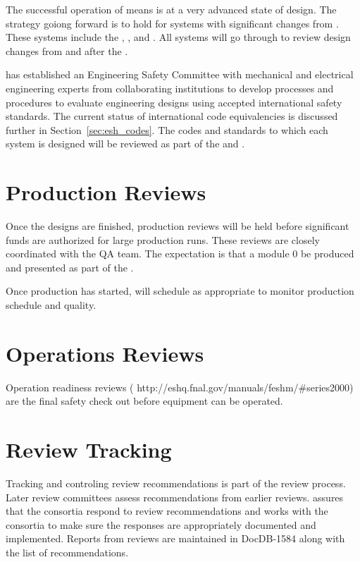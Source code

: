 The successful operation of  means  is at
a very advanced state of design. The strategy goiong forward is to
hold  for systems with significant changes from
. These systems include the , , and
. All systems will go through  to review
design changes from  and  after the
.

 has established an Engineering Safety Committee with
mechanical and electrical engineering experts from collaborating
institutions to develop processes and procedures to evaluate engineering designs using accepted international safety
standards. The current status of international code equivalencies is
discussed further in Section~\ref{sec:esh_codes}. The codes and
standards to which each system is designed will be reviewed as part of
the  and .

\section{Production Reviews}

Once the designs are finished, production reviews will be held
before significant funds are authorized for large production
runs. These reviews are closely coordinated with the QA team. The
expectation is that a module 0 be produced and presented as part of the .

Once production has started,  will schedule 
as appropriate to monitor production schedule and quality.

\section{Operations Reviews}

Operation readiness reviews (
http://eshq.fnal.gov/manuals/feshm/\#series2000) are the final safety
check out before equipment can be operated.

\section{Review Tracking}

Tracking and controling review recommendations is part of the review
process. Later review committees assess recommendations from earlier reviews.  assures that
the consortia respond to review recommendations and 
works with the consortia to make sure the responses are appropriately documented and
implemented. Reports from  reviews are maintained in
DocDB-1584 along with the list of recommendations.

